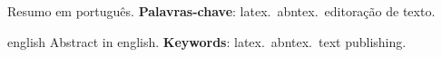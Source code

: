 \begin{resumo}
Resumo em português.
\vspace{\onelineskip}
\noindent
\textbf{Palavras-chave}: latex.\ abntex.\ editoração de texto.
\end{resumo}

\begin{resumo}[Abstract]
\begin{otherlanguage*}{english}
Abstract in english.
\vspace{\onelineskip}
\noindent
\textbf{Keywords}: latex.\ abntex.\ text publishing.
\end{otherlanguage*}
\end{resumo}
\cleardoublepage{}
